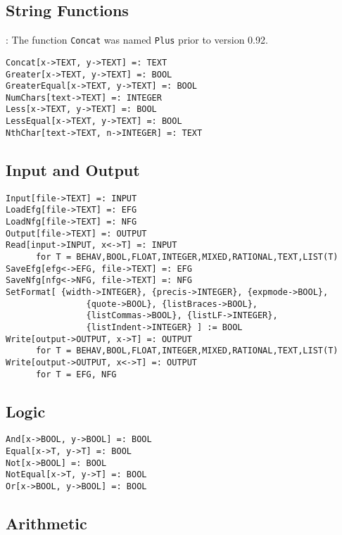 \subsection{String Functions}

: The function {\tt Concat} was named {\tt Plus}
prior to version 0.92.

\begin{verbatim}
Concat[x->TEXT, y->TEXT] =: TEXT
Greater[x->TEXT, y->TEXT] =: BOOL
GreaterEqual[x->TEXT, y->TEXT] =: BOOL
NumChars[text->TEXT] =: INTEGER
Less[x->TEXT, y->TEXT] =: BOOL
LessEqual[x->TEXT, y->TEXT] =: BOOL
NthChar[text->TEXT, n->INTEGER] =: TEXT
\end{verbatim}


\subsection{Input and Output}

\begin{verbatim}
Input[file->TEXT] =: INPUT
LoadEfg[file->TEXT] =: EFG
LoadNfg[file->TEXT] =: NFG
Output[file->TEXT] =: OUTPUT
Read[input->INPUT, x<->T] =: INPUT  
      for T = BEHAV,BOOL,FLOAT,INTEGER,MIXED,RATIONAL,TEXT,LIST(T)
SaveEfg[efg<->EFG, file->TEXT] =: EFG
SaveNfg[nfg<->NFG, file->TEXT] =: NFG
SetFormat[ {width->INTEGER}, {precis->INTEGER}, {expmode->BOOL},
                {quote->BOOL}, {listBraces->BOOL},
                {listCommas->BOOL}, {listLF->INTEGER},
                {listIndent->INTEGER} ] := BOOL
Write[output->OUTPUT, x->T] =: OUTPUT  
      for T = BEHAV,BOOL,FLOAT,INTEGER,MIXED,RATIONAL,TEXT,LIST(T)
Write[output->OUTPUT, x<->T] =: OUTPUT 
      for T = EFG, NFG
\end{verbatim}

\subsection{Logic}

\begin{verbatim}
And[x->BOOL, y->BOOL] =: BOOL
Equal[x->T, y->T] =: BOOL
Not[x->BOOL] =: BOOL
NotEqual[x->T, y->T] =: BOOL
Or[x->BOOL, y->BOOL] =: BOOL
\end{verbatim}

\subsection{Arithmetic}

